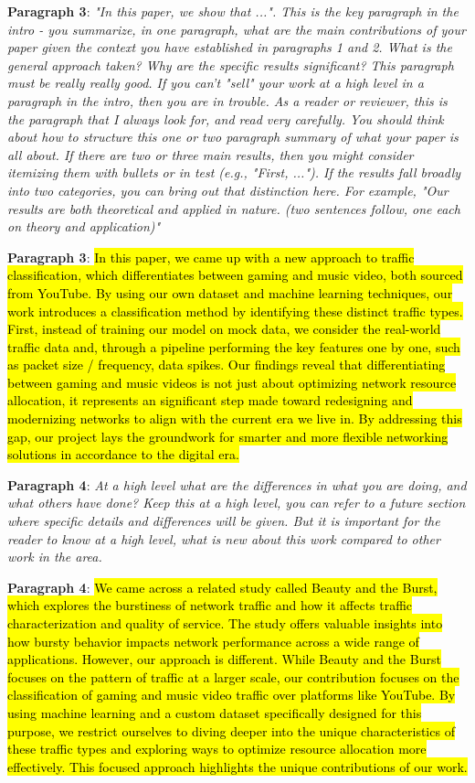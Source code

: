 \textbf{Paragraph 3}: \textit{"In this paper, we show that ...". This is the key paragraph in the intro - you summarize, in one paragraph, what are the main contributions of your paper given the context you have established in paragraphs 1 and 2. What is the general approach taken? Why are the specific results significant? This paragraph must be really really good. If you can't "sell" your work at a high level in a paragraph in the intro, then you are in trouble. As a reader or reviewer, this is the paragraph that I always look for, and read very carefully.
You should think about how to structure this one or two paragraph summary of what your paper is all about. If there are two or three main results, then you might consider itemizing them with bullets or in test (e.g., "First, ..."). If the results fall broadly into two categories, you can bring out that distinction here. For example, "Our results are both theoretical and applied in nature. (two sentences follow, one each on theory and application)"}

\textbf{Paragraph 3}: \hl{In this paper, we came up with a new approach to traffic classification, which differentiates between gaming and music video, both sourced from YouTube. By using our own dataset and machine learning techniques, our work introduces a classification method by identifying these distinct traffic types. First, instead of training our model on mock data, we consider the real-world traffic data and, through a pipeline performing the key features one by one, such as packet size / frequency, data spikes. Our findings reveal that differentiating between gaming and music videos is not just about optimizing network resource allocation, it represents an significant step made toward redesigning and modernizing networks to align with the current era we live in. By addressing this gap, our project lays the groundwork for  smarter and more flexible networking solutions in accordance to the digital era.}

\textbf{Paragraph 4}: \textit{At a high level what are the differences in what you are doing, and what others have done? Keep this at a high level, you can refer to a future section where specific details and differences will be given. But it is important for the reader to know at a high level, what is new about this work compared to other work in the area.}

\textbf{Paragraph 4}: \hl{We came across a related study called Beauty and the Burst, which explores the burstiness of network traffic and how it affects traffic characterization and quality of service. The study offers valuable insights into how bursty behavior impacts network performance across a wide range of applications. However, our approach is different. While Beauty and the Burst focuses on the pattern of traffic at a larger scale, our contribution focuses on the classification of gaming and music video traffic over platforms like YouTube. By using machine learning and a custom dataset specifically designed for this purpose, we restrict ourselves to diving deeper into the unique characteristics of these traffic types and exploring ways to optimize resource allocation more effectively. This focused approach highlights the unique contributions of our work.}


